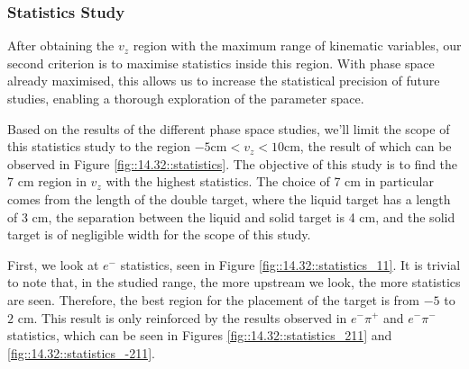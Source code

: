 \subsubsection{Statistics Study}
\label{14.32::statistics_study}
    After obtaining the $v_z$ region with the maximum range of kinematic variables, our second criterion is to maximise statistics inside this region.
    With phase space already maximised, this allows us to increase the statistical precision of future studies, enabling a thorough exploration of the parameter space.

    Based on the results of the different phase space studies, we'll limit the scope of this statistics study to the region $-5 \text{cm} < v_z < 10 \text{cm}$, the result of which can be observed in Figure \ref{fig::14.32::statistics}.
    The objective of this study is to find the 7 cm region in $v_z$ with the highest statistics.
    The choice of 7 cm in particular comes from the length of the double target, where the liquid target has a length of 3 cm, the separation between the liquid and solid target is 4 cm, and the solid target is of negligible width for the scope of this study.

    First, we look at $e^-$ statistics, seen in Figure \ref{fig::14.32::statistics_11}.
    It is trivial to note that, in the studied range, the more upstream we look, the more statistics are seen.
    Therefore, the best region for the placement of the target is from $-5$ to $2$ cm.
    This result is only reinforced by the results observed in $e^-\pi^+$ and $e^-\pi^-$ statistics, which can be seen in Figures \ref{fig::14.32::statistics_211} and \ref{fig::14.32::statistics_-211}.
